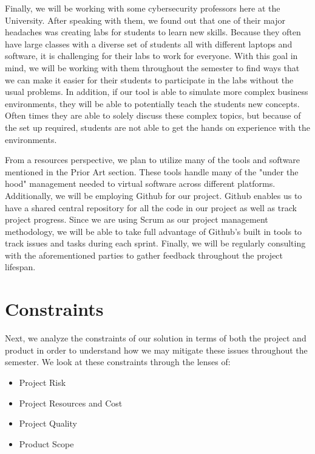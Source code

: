 \documentclass[openright]{report}
\begin{document}
\par Finally, we will be working with some cybersecurity professors here at the University. After speaking with them, we found out that one of their major headaches was creating labs for students to learn new skills. Because they often have large classes with a diverse set of students all with different laptops and software, it is challenging for their labs to work for everyone\cite{ibrahiminterview}. With this goal in mind, we will be working with them throughout the semester to find ways that we can make it easier for their students to participate in the labs without the usual problems. In addition, if our tool is able to simulate more complex business environments, they will be able to potentially teach the students new concepts. Often times they are able to solely discuss these complex topics, but because of the set up required, students are not able to get the hands on experience with the environments.

\par From a resources perspective, we plan to utilize many of the tools and software mentioned in the Prior Art section. These tools handle many of the "under the hood" management needed to virtual software across different platforms. Additionally, we will be employing Github for our project. Github enables us to have a shared central repository for all the code in our project as well as track project progress. Since we are using Scrum as our project management methodology, we will be able to take full advantage of Github's built in tools to track issues and tasks during each sprint. Finally, we will be regularly consulting with the aforementioned parties to gather feedback throughout the project lifespan.

\section{Constraints}

\par Next, we analyze the constraints of our solution in terms of both the project and product in order to understand how we may mitigate these issues throughout the semester. We look at these constraints through the lenses of:
\begin{itemize}
    \item Project Risk
    \item Project Resources and Cost
    \item Project Quality
    \item Product Scope
\end{itemize}
\end{document}
